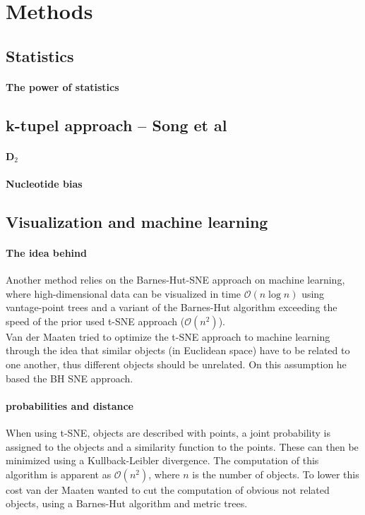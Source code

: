 \documentclass[twocolumn]{bmcart}%
\begin{document}
\section*{Methods}
\subsection*{Statistics}
\paragraph*{The power of statistics}

\subsection*{k-tupel approach -- Song et al}
\paragraph*{D$_2$}
\paragraph*{Nucleotide bias}
\subsection*{Visualization and machine learning}
\paragraph*{The idea behind}
Another method relies on the Barnes-Hut-SNE\cite{DBLP:journals/corr/abs-1301-3342} approach on machine learning, where high-dimensional data can be visualized in time $\mathcal{O}(n \log n)$ using vantage-point trees and a variant of the Barnes-Hut algorithm exceeding the speed of the prior used t-SNE approach ($\mathcal{O}(n^2)$).\\
Van der Maaten tried to optimize the t-SNE approach to machine learning through the idea that similar objects (in Euclidean space) have to be related to one another, thus different objects should be unrelated. On this assumption he based the BH SNE approach.
\paragraph*{probabilities and distance}
When using t-SNE, objects are described with points, a joint probability is assigned to the objects and a similarity function to the points. These can then be minimized using a Kullback-Leibler divergence. \cite{DBLP:journals/corr/abs-1301-3342} The computation of this algorithm is apparent as $\mathcal{O}(n^2)$, where $n$ is the number of objects. To lower this cost van der Maaten wanted to cut the computation of obvious not related objects, using a Barnes-Hut algorithm and metric trees.
\end{document}
